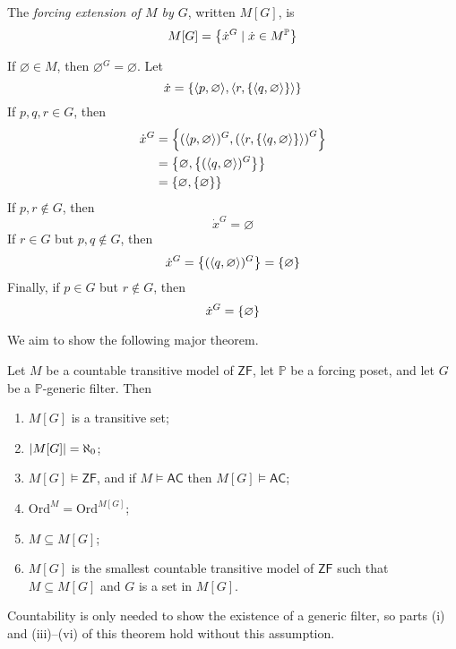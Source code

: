 \begin{definition}
    The \emph{forcing extension of \( M \) by \( G \)}, written \( M[G] \), is
    \[ M[G] = \qty{\dot x^G \mid \dot x \in M^{\mathbb P}} \]
\end{definition}
\begin{example}
    If \( \varnothing \in M \), then \( \varnothing^G = \varnothing \).
    Let
    \[ \dot x = \qty{\langle p, \varnothing \rangle, \langle r, \qty{\langle q, \varnothing \rangle} \rangle} \]
    If \( p, q, r \in G \), then
    \begin{align*}
        \dot x^G &= \qty{(\langle p, \varnothing \rangle)^G, \qty(\langle r, \qty{\langle q, \varnothing \rangle} \rangle)^G} \\
        &= \qty{\varnothing, \qty{(\langle q, \varnothing \rangle)^G}} \\
        &= \qty{\varnothing, \qty{\varnothing}}
    \end{align*}
    If \( p, r \notin G \), then
    \[ \dot x^G = \varnothing \]
    If \( r \in G \) but \( p, q \notin G \), then
    \[ \dot x^G = \qty{(\langle q, \varnothing \rangle)^G} = \qty{\varnothing} \]
    Finally, if \( p \in G \) but \( r \notin G \), then
    \[ \dot x^G = \qty{\varnothing} \]
\end{example}
We aim to show the following major theorem.
\begin{theorem}
    Let \( M \) be a countable transitive model of \( \mathsf{ZF} \), let \( \mathbb P \) be a forcing poset, and let \( G \) be a \( \mathbb P \)-generic filter.
    Then
    \begin{enumerate}
        \item \( M[G] \) is a transitive set;
        \item \( \abs{M[G]} = \aleph_0 \);
        \item \( M[G] \vDash \mathsf{ZF} \), and if \( M \vDash \mathsf{AC} \) then \( M[G] \vDash \mathsf{AC} \);
        \item \( \mathrm{Ord}^M = \mathrm{Ord}^{M[G]} \);
        \item \( M \subseteq M[G] \);
        \item \( M[G] \) is the smallest countable transitive model of \( \mathsf{ZF} \) such that \( M \subseteq M[G] \) and \( G \) is a set in \( M[G] \).
    \end{enumerate}
\end{theorem}
Countability is only needed to show the existence of a generic filter, so parts (i) and (iii)--(vi) of this theorem hold without this assumption.

